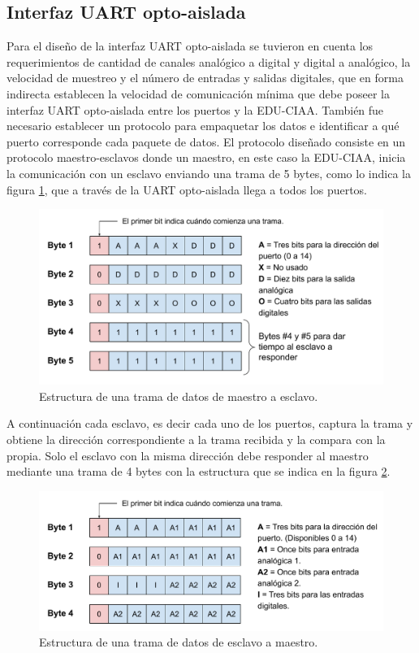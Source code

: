 \subsection{Interfaz UART opto-aislada}
	
Para el diseño de la interfaz UART opto-aislada se tuvieron en cuenta los requerimientos de cantidad de canales analógico a digital y digital a analógico, la velocidad de muestreo y el número de entradas y salidas digitales, que en forma indirecta establecen la velocidad de comunicación mínima que debe poseer la interfaz UART opto-aislada entre los puertos y la EDU-CIAA.
También fue necesario establecer un protocolo para empaquetar los datos e identificar a qué puerto corresponde cada paquete de datos.
El protocolo diseñado consiste en un protocolo maestro-esclavos donde un maestro, en este caso la EDU-CIAA, inicia la comunicación con un esclavo enviando una trama de 5 bytes, como lo indica la figura \ref{fig:TramaMS}, que a través de la UART opto-aislada llega a todos los puertos.

\begin{figure}[H]
	\centering
	\includegraphics[width=1\textwidth]{./Figures/TramaMS.pdf}
	\caption{Estructura de una trama de datos de maestro a esclavo.}
	\label{fig:TramaMS}
\end{figure}

A continuación cada esclavo, es decir cada uno de los puertos, captura la trama y obtiene la dirección correspondiente a la trama recibida y la compara con la propia. Solo el esclavo con la misma dirección debe responder al maestro mediante una trama de 4 bytes con la estructura que se indica en la figura \ref{fig:TramaSM}.

\begin{figure}[H]
	\centering
	\includegraphics[width=1\textwidth]{./Figures/TramaSM.pdf}
	\caption{Estructura de una trama de datos de esclavo a maestro.}
	\label{fig:TramaSM}
\end{figure}

